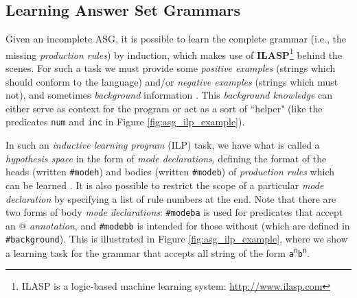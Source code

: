 \subsection*{Learning Answer Set Grammars}

Given an incomplete ASG, it is possible to learn the complete grammar (i.e., the missing \textit{production rules}) by induction, which makes use of \textbf{ILASP}\footnote{ILASP is a logic-based machine learning system: \url{http://www.ilasp.com}} behind the scenes. For such a task we must provide some \textit{positive examples} (strings which should conform to the language) and/or \textit{negative examples}  (strings which must not), and sometimes \textit{background} information \cite{law_representing_2019}. This \textit{background knowledge} can either serve as context for the program or act as a sort of ``helper" (like the predicates \texttt{num} and \texttt{inc} in Figure \ref{fig:asg_ilp_example}).

In such an \textit{inductive learning program} (ILP) task, we have what is called a \textit{hypothesis space} in the form of \textit{mode declarations}, defining the format of the heads (written \texttt{\#modeh}) and bodies (written \texttt{\#modeb}) of \textit{production rules} which can be learned \cite{law_inductive_nodate}. It is also possible to restrict the scope of a particular \textit{mode declaration} by specifying a list of rule numbers at the end. Note that there are two forms of body \textit{mode declarations}: \texttt{\#modeba} is used for predicates that accept an $@$ \textit{annotation}, and \texttt{\#modebb} is intended for those without (which are defined in \texttt{\#background}). This is illustrated in Figure \ref{fig:asg_ilp_example}, where we show a learning task for the grammar that accepts all string of the form \texttt{a\textsuperscript{n}b\textsuperscript{n}}.

